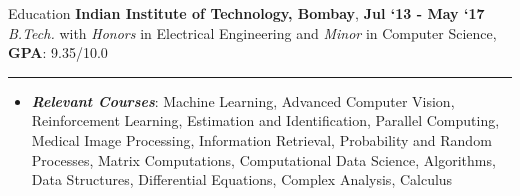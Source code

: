 \documentclass{resume} %
\begin{document}
\begin{rSection}{Education}
\textbf{Indian Institute of Technology, Bombay}, \hfill \textbf{Jul `13 - May `17}\\
\hspace*{2pt} \textit{B.Tech.} with \textit{Honors} in Electrical Engineering and \textit{Minor} in Computer Science, \small \textbf{GPA}: 9.35/10.0 \\
\rule{\linewidth}{0.1pt}
\begin{itemize}[leftmargin=0pt,label={}]
    \item \textbf{\textit{Relevant Courses}}: Machine Learning, Advanced Computer Vision, Reinforcement Learning, Estimation and Identification, Parallel Computing, Medical Image Processing,  Information Retrieval, Probability and Random Processes, Matrix Computations, Computational Data Science, Algorithms, Data Structures, Differential Equations, Complex Analysis, Calculus
\end{itemize}
\vspace{10pt}

\end{rSection}


\vspace*{-14pt}
\end{document}
